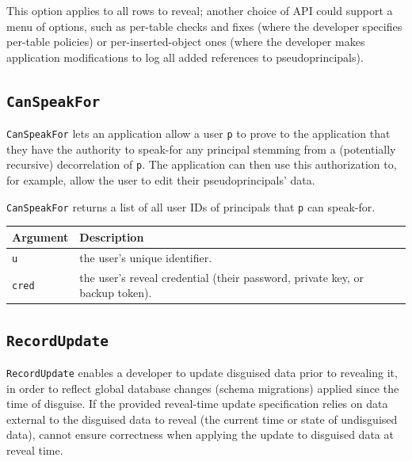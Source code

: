 This option applies to all rows to reveal; another choice of API
could support a menu of options, such as per-table checks and fixes
(where the developer specifies per-table policies) or
per-inserted-object ones (where the developer makes application
modifications to log all added references to pseudoprincipals).

\subsection{\texttt{CanSpeakFor}}
    \texttt{CanSpeakFor} lets an application allow a user \texttt{p} to prove to
    the application that they have the authority to speak-for any principal
    stemming from a (potentially recursive) decorrelation of \texttt{p}. The
    application can then use this authorization to, for example, allow the user
    to edit their pseudoprincipals' data.
    
    \texttt{CanSpeakFor} returns a list of all user IDs of principals that
    \texttt{p} can speak-for.

\begin{center}
    \begin{longtable}{|m{}|m{}|}
        \hline
        \textbf{Argument} & \textbf{Description} \\
        \hline
             \texttt{u}& the user's unique identifier. \\
        \hline
             \texttt{cred}& the user's reveal credential (their password, private key, or
    backup token).\\
        \hline
    \end{longtable}
    \end{center}
   
    
\subsection{\texttt{RecordUpdate}}
\label{s:semantics:updates}

\texttt{RecordUpdate} enables a developer to update disguised data prior to
revealing it, in order to reflect global database changes (\eg schema migrations)
applied since the time of disguise.
If the provided reveal-time update specification relies on data external to the
disguised data to reveal (\eg the current time or state of undisguised data),
\sys cannot ensure correctness when applying the update to disguised data at
reveal time.

